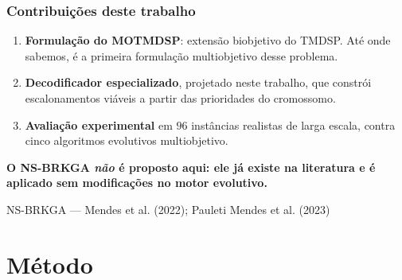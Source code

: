 \documentclass[
	11pt,
	aspectratio=169, %
]{beamer}
\newcommand{\alg}[1]{#1}
\newcommand{\takeaway}[1]{%
  \vspace{0.35em}%
  \begin{center}%
  \colorbox{mylightorange1!40}{%
    \parbox{0.90\textwidth}{\centering\small\textbf{#1}}}%
  \end{center}%
}
\newcommand{\srcnote}[1]{%
  \vfill
  {\raggedleft\scriptsize\color{black!55}#1\par}%
}
\begin{document}
\begin{frame}
\frametitle{Contribui\c{c}\~oes deste trabalho}

\begin{enumerate}\setlength{\itemsep}{9pt}
\item \textbf{Formula\c{c}\~ao do MOTMDSP}: extens\~ao biobjetivo do TMDSP.
      At\'e onde sabemos, \'e a primeira formula\c{c}\~ao multiobjetivo desse
      problema.

\item \textbf{Decodificador especializado}, projetado neste trabalho, que
      constr\'oi escalonamentos vi\'aveis a partir das prioridades do cromossomo.

\item \textbf{Avalia\c{c}\~ao experimental} em $96$ inst\^ancias realistas de
      larga escala, contra cinco algoritmos evolutivos multiobjetivo.
\end{enumerate}

\takeaway{O \alg{NS-BRKGA} \emph{n\~ao} \'e proposto aqui: ele j\'a existe na
literatura e \'e aplicado \textbf{sem modifica\c{c}\~oes} no motor evolutivo.}

\srcnote{\alg{NS-BRKGA} --- Mendes et al. (2022); Pauleti Mendes et al. (2023)}
\end{frame}

\section{Método}
\end{document}
